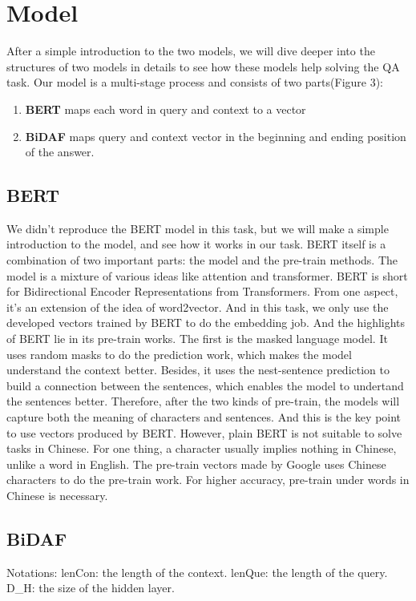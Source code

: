 \documentclass{article}
\begin{document}
\section{Model}
After a simple introduction to the two models, we will dive deeper into the structures of two models in details to see how these models help solving the QA task.
\noindent Our model is a multi-stage process and consists of two parts(Figure 3):\\
\begin{enumerate}
	\item \textbf{BERT} maps each word in query and context to a vector  
	\item \textbf{BiDAF} maps query and context vector in the beginning and ending position of the answer.
\end{enumerate}
\subsection{BERT}
We didn't reproduce the BERT model in this task, but we will make a simple introduction to the model, and see how it works in our task. 
BERT itself is a combination of two important parts: the model and the pre-train methods. 
The model is a mixture of various ideas like attention and transformer. BERT is short for Bidirectional Encoder Representations from Transformers. From one aspect, it's an extension of the idea of word2vector. And in this task, we only use the developed vectors trained by BERT to do the embedding job. 
And the highlights of BERT lie in its pre-train works. The first is the masked language model. It uses random masks to do the prediction work, which makes the model understand the context better. Besides, it uses the nest-sentence prediction to build a connection between the sentences, which enables the model to undertand the sentences better. Therefore, after the two kinds of pre-train, the models will capture both the meaning of characters and sentences. And this is the key point to use vectors produced by BERT.
However, plain BERT is not suitable to solve tasks in Chinese. For one thing, a character usually implies nothing in Chinese, unlike a word in English. The pre-train vectors made by Google uses Chinese characters to do the pre-train work. For higher accuracy, pre-train under words in Chinese is necessary.
\subsection{BiDAF}

Notations: 
lenCon: the length of the context.
lenQue: the length of the query.
D_H: the size of the hidden layer.
\end{document}
